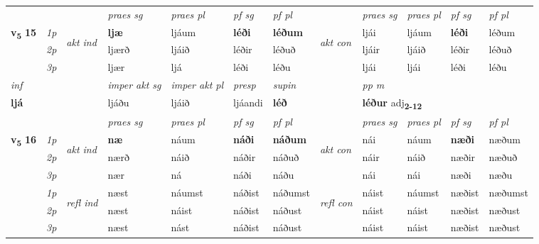 \begin{longtable}[l]{X>{\footnotesize\itshape}llXXXXlXXXX}
\midrule

 & &   & \textit{praes sg}  & \textit{praes pl}    & \textit{ pf sg} & \textit{pf pl} & & \textit{praes sg}  & \textit{praes pl}    & \textit{pf sg} & \textit{pf pl }  \\ \cmidrule{4-7} \cmidrule{9-12}
 \multirow{2}{*}{{{\textbf{v{\textsubscript{5}}} \Large{\textbf{15}}}}}  & 1p & \multirow{3}{*}{\begin{turn}{90}\textit{akt ind}\end{turn}} & \textbf{ljæ} & ljáum & \textbf{léði} & \textbf{léðum} & \multirow{3}{*}{\begin{turn}{90}\textit{akt con}\end{turn}} &ljái & ljáum & \textbf{léði} & léðum\\*
 & 2p &  &  ljærð  & ljáið & léðir & léðuð & & ljáir & ljáið & léðir & léðuð \\*
 & 3p &  & ljær & ljá & léði & léðu & & ljái & ljái& léði & léðu \\*
\cmidrule{4-7} \cmidrule{9-12}

   {\textit{inf}} & &  & \textit{imper akt sg} & \textit{imper akt pl}   & \textit{presp} & \textit{supin}  && \textit{pp m} \\*
  {\textbf{ljá}} & && ljáðu  & ljáið   & ljáandi &  \textbf{léð}  && \multicolumn{2}{l}{\textbf{léður} adj\textbf{\textsubscript{2-12}}} \\*

\midrule

 & &   & \textit{praes sg}  & \textit{praes pl}    & \textit{ pf sg} & \textit{pf pl} & & \textit{praes sg}  & \textit{praes pl}    & \textit{pf sg} & \textit{pf pl }  \\ \cmidrule{4-7} \cmidrule{9-12}
 \multirow{2}{*}{{{\textbf{v{\textsubscript{5}}} \Large{\textbf{16}}}}}  & 1p & \multirow{3}{*}{\begin{turn}{90}\textit{akt ind}\end{turn}} & \textbf{næ} & náum & \textbf{náði} & \textbf{náðum} & \multirow{3}{*}{\begin{turn}{90}\textit{akt con}\end{turn}} &nái & náum & \textbf{næði} & næðum\\*
 & 2p &  &  nærð  & náið & náðir & náðuð & & náir & náið & næðir & næðuð \\*
 & 3p &  & nær & ná & náði & náðu & & nái & nái& næði & næðu \\*
\cmidrule{4-7} \cmidrule{9-12}
 & 1p & \multirow{3}{*}{\begin{turn}{90}\textit{refl ind}\end{turn}}  & næst & náumst & náðist & náðumst & \multirow{3}{*}{\begin{turn}{90}\textit{refl con}\end{turn}}  &náist & náumst & næðist & næðumst \\*
 & 2p &  & næst & náist & náðist & náðust & &náist & náist & næðist & næðust \\*
 & 3p  & & næst & nást & náðist & náðust & & náist & náist& næðist & næðust \\*
\cmidrule{4-7} \cmidrule{9-12}


\end{longtable}
